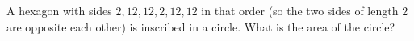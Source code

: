 A hexagon with sides $2,12,12,2,12,12$ in that order (so the two sides of length $2$ are opposite each other) is inscribed in a circle. What is the area of the circle?
